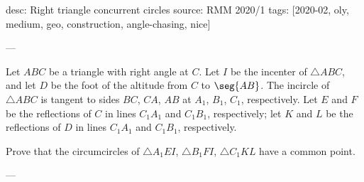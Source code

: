 desc: Right triangle concurrent circles
source: RMM 2020/1
tags: [2020-02, oly, medium, geo, construction, angle-chasing, nice]

---

Let $ABC$ be a triangle with right angle at $C$. Let $I$ be the incenter of $\triangle ABC$, and let $D$ be the foot of the altitude from $C$ to $\seg{AB}$. The incircle of $\triangle ABC$ is tangent to sides $BC$, $CA$, $AB$ at $A_1$, $B_1$, $C_1$, respectively. Let $E$ and $F$ be the reflections of $C$ in lines $C_1A_1$ and $C_1B_1$, respectively; let $K$ and $L$ be the reflections of $D$ in lines $C_1A_1$ and $C_1B_1$, respectively.

Prove that the circumcircles of $\triangle A_1EI$, $\triangle B_1FI$, $\triangle C_1KL$ have a common point.

---


